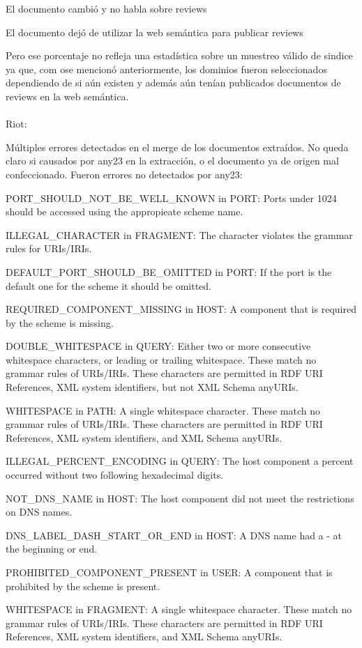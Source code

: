El documento cambió y no habla sobre reviews

El documento dejó de utilizar la web semántica para publicar reviews

Pero ese porcentaje no refleja una estadística sobre un muestreo válido de sindice ya que, com ose mencionó anteriormente, los dominios fueron seleccionados 
dependiendo de si aún existen y además aún tenían publicados documentos de reviews en la web semántica.
\\
\\
Riot:

Múltiples errores detectados en el merge de los documentos extraídos. No queda claro si causados por any23 en la extracción, o el documento ya de origen 
mal confeccionado. Fueron errores  no detectados por any23:

PORT\_SHOULD\_NOT\_BE\_WELL\_KNOWN in PORT: Ports under 1024 should be accessed using the appropieate scheme name. 

ILLEGAL\_CHARACTER in FRAGMENT: The character violates the grammar rules for URIs/IRIs.

DEFAULT\_PORT\_SHOULD\_BE\_OMITTED in PORT: If the port is the default one for the scheme it should be omitted. 

REQUIRED\_COMPONENT\_MISSING in HOST: A component that is required by the scheme is missing.

DOUBLE\_WHITESPACE in QUERY: Either two or more consecutive whitespace characters, or leading or trailing whitespace. These match no grammar rules of URIs/IRIs. These characters are permitted in RDF URI References, XML system identifiers, but not XML Schema anyURIs.

WHITESPACE in PATH: A single whitespace character. These match no grammar rules of URIs/IRIs. These characters are permitted in RDF URI References, XML system identifiers, and XML Schema anyURIs.

ILLEGAL\_PERCENT\_ENCODING in QUERY: The host component a percent occurred without two following hexadecimal digits.

NOT\_DNS\_NAME in HOST: The host component did not meet the restrictions on DNS names.

DNS\_LABEL\_DASH\_START\_OR\_END in HOST: A DNS name had a - at the beginning or end.

PROHIBITED\_COMPONENT\_PRESENT in USER: A component that is prohibited by the scheme is present.

WHITESPACE in FRAGMENT: A single whitespace character. These match no grammar rules of URIs/IRIs. These characters are permitted in RDF URI References, XML system identifiers, and XML Schema anyURIs.


